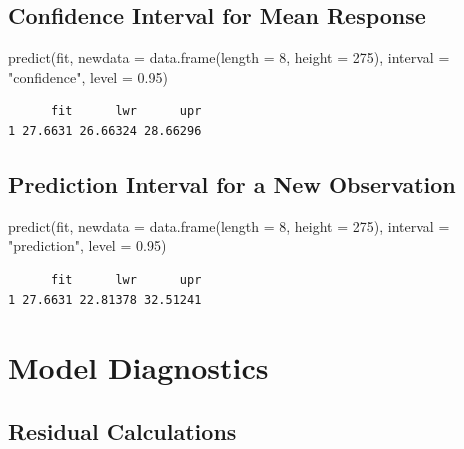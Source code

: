 \documentclass[
  letterpaper,
  DIV=11,
  numbers=noendperiod]{scrreprt}
\newenvironment{Shaded}{\begin{snugshade}}{\end{snugshade}}
\newcommand{\AttributeTok}[1]{\textcolor[rgb]{0.40,0.45,0.13}{#1}}
\newcommand{\DecValTok}[1]{\textcolor[rgb]{0.68,0.00,0.00}{#1}}
\newcommand{\FloatTok}[1]{\textcolor[rgb]{0.68,0.00,0.00}{#1}}
\newcommand{\FunctionTok}[1]{\textcolor[rgb]{0.28,0.35,0.67}{#1}}
\newcommand{\NormalTok}[1]{\textcolor[rgb]{0.00,0.23,0.31}{#1}}
\newcommand{\StringTok}[1]{\textcolor[rgb]{0.13,0.47,0.30}{#1}}
\begin{document}
\subsection{Confidence Interval for Mean
Response}\label{confidence-interval-for-mean-response}

\begin{Shaded}
\begin{Highlighting}[]
\FunctionTok{predict}\NormalTok{(fit, }\AttributeTok{newdata =} \FunctionTok{data.frame}\NormalTok{(}\AttributeTok{length =} \DecValTok{8}\NormalTok{, }\AttributeTok{height =} \DecValTok{275}\NormalTok{),}
        \AttributeTok{interval =} \StringTok{"confidence"}\NormalTok{, }\AttributeTok{level =} \FloatTok{0.95}\NormalTok{)}
\end{Highlighting}
\end{Shaded}

\begin{verbatim}
      fit      lwr      upr
1 27.6631 26.66324 28.66296
\end{verbatim}

\subsection{Prediction Interval for a New
Observation}\label{prediction-interval-for-a-new-observation}

\begin{Shaded}
\begin{Highlighting}[]
\FunctionTok{predict}\NormalTok{(fit, }\AttributeTok{newdata =} \FunctionTok{data.frame}\NormalTok{(}\AttributeTok{length =} \DecValTok{8}\NormalTok{, }\AttributeTok{height =} \DecValTok{275}\NormalTok{),}
        \AttributeTok{interval =} \StringTok{"prediction"}\NormalTok{, }\AttributeTok{level =} \FloatTok{0.95}\NormalTok{)}
\end{Highlighting}
\end{Shaded}

\begin{verbatim}
      fit      lwr      upr
1 27.6631 22.81378 32.51241
\end{verbatim}

\section{Model Diagnostics}\label{model-diagnostics}

\subsection{Residual Calculations}\label{residual-calculations}
\end{document}
